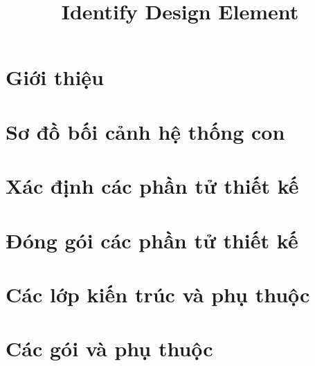 \documentclass[11pt, a4paper]{article}
\title{Identify Design Element}
\begin{document}
	
	
	\clearpage
	
	
	\clearpage
	
	\tableofcontents 
	\clearpage
	
	
	
	
	 
	
	
	
	\section{Giới thiệu}
	

	
	\section{Sơ đồ bối cảnh hệ thống con}
	
	
	\section{Xác định các phần tử thiết kế}
	
	
	\section{Đóng gói các phần tử thiết kế}
	
	
	
	\section{Các lớp kiến trúc và phụ thuộc}
	
	
	
	\section{Các gói và phụ thuộc}
	
	
	
	
	\clearpage
	\glsaddall
	\printglossary[title={Giải thích thuật ngữ}]

	
\end{document}
